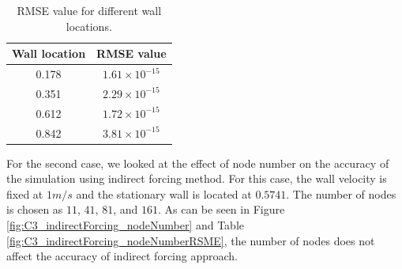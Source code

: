 \begin{table}[H]
\centering
\begin{tabular}{c | c}
	 Wall location & RMSE value \\ \hline \hline
	 0.178 & $1.61 \times 10^{-15}$ \\ \hline
	 0.351 & $2.29 \times 10^{-15}$ \\ \hline
	 0.612 & $1.72 \times 10^{-15}$ \\ \hline
	 0.842 & $3.81 \times 10^{-15}$
\end{tabular}
\caption{RMSE value for different wall locations.}
\label{table:C3_indirectForcing_wallLocationRSME}
\end{table}

For the second case, we looked at the effect of node number on the accuracy of the simulation using indirect forcing method. For this case, the wall velocity is fixed at $1 m/s$ and the stationary wall is located at $0.5741$. The number of nodes is chosen as $11$, $41$, $81$, and $161$. As can be seen in Figure \ref{fig:C3_indirectForcing_nodeNumber} and Table \ref{fig:C3_indirectForcing_nodeNumberRSME}, the number of nodes does not affect the accuracy of indirect forcing approach.

